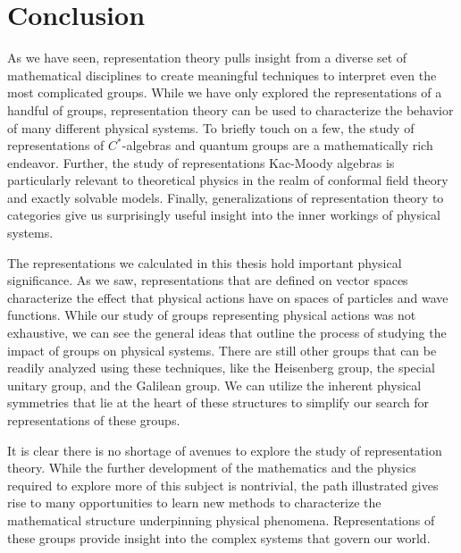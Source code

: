 \chapter{Conclusion}
As we have seen, representation theory pulls insight from a diverse set of mathematical disciplines to create meaningful techniques to interpret even the most complicated groups. While we have only explored the representations of a handful of groups, representation theory can be used to characterize the behavior of many different physical systems. To briefly touch on a few, the study of representations of $C^*$-algebras and quantum groups are a mathematically rich endeavor. Further, the study of representations Kac-Moody algebras is particularly relevant to theoretical physics in the realm of conformal field theory and exactly solvable models. Finally, generalizations of representation theory to categories give us surprisingly useful insight into the inner workings of physical systems. 

The representations we calculated in this thesis hold important physical significance. As we saw, representations that are defined on vector spaces characterize the effect that physical actions have on spaces of particles and wave functions. While our study of groups representing physical actions was not exhaustive, we can see the general ideas that outline the process of studying the impact of groups on physical systems. There are still other groups that can be readily analyzed using these techniques, like the Heisenberg group, the special unitary group, and the Galilean group. We can utilize the inherent physical symmetries that lie at the heart of these structures to simplify our search for representations of these groups. 

It is clear there is no shortage of avenues to explore the study of representation theory. While the further development of the mathematics and the physics required to explore more of this subject is nontrivial, the path illustrated gives rise to many opportunities to learn new methods to characterize the mathematical structure underpinning physical phenomena. Representations of these groups provide insight into the complex systems that govern our world.